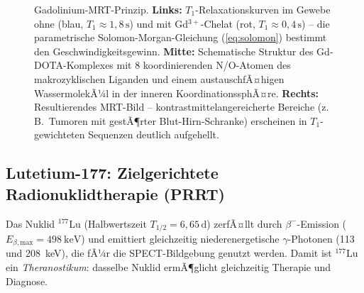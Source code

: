 ﻿\documentclass[12pt, a4paper]{report}
\theoremstyle{definition}
\theoremstyle{remark}
\begin{document}
\begin{figure}[htbp]
\caption{Gadolinium-MRT-Prinzip.
  \textbf{Links:} $T_1$-Relaxationskurven im Gewebe ohne (blau,
  $T_1 \approx 1{,}8\,\text{s}$) und mit Gd$^{3+}$-Chelat (rot,
  $T_1 \approx 0{,}4\,\text{s}$) -- die parametrische Solomon-Morgan-Gleichung
  (\ref{eq:solomon}) bestimmt den Geschwindigkeitsgewinn.
  \textbf{Mitte:} Schematische Struktur des Gd-DOTA-Komplexes mit 8
  koordinierenden N/O-Atomen des makrozyklischen Liganden und einem
  austauschfÃ¤higen WassermolekÃ¼l in der inneren KoordinationssphÃ¤re.
  \textbf{Rechts:} Resultierendes MRT-Bild -- kontrastmittelangereicherte
  Bereiche (z.\,B.\ Tumoren mit gestÃ¶rter Blut-Hirn-Schranke) erscheinen
  in $T_1$-gewichteten Sequenzen deutlich aufgehellt.}
\label{fig:re_mrt}
\end{figure}

\subsection{\texorpdfstring{Lutetium-177: Zielgerichtete Radionuklidtherapie (PRRT)}{Lutetium-177: Zielgerichtete Radionuklidtherapie (PRRT)}}

Das Nuklid $^{177}$Lu (Halbwertszeit $T_{1/2} = 6{,}65\,\text{d}$) zerfÃ¤llt
durch $\beta^-$-Emission ($E_{\beta,\text{max}} = \SI{498}{\kilo\electronvolt}$)
und emittiert gleichzeitig niederenergetische $\gamma$-Photonen (113 und
208~keV), die fÃ¼r die SPECT-Bildgebung genutzt werden. Damit ist
$^{177}$Lu ein \emph{Theranostikum}: dasselbe Nuklid ermÃ¶glicht gleichzeitig
Therapie und Diagnose.
\end{document}
